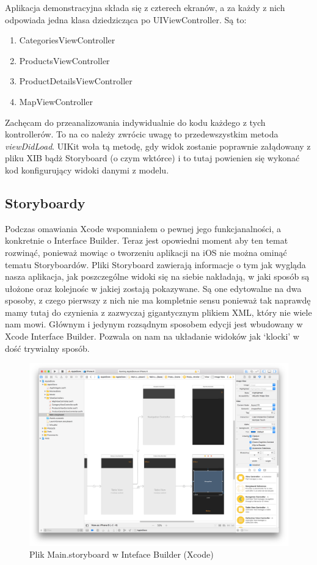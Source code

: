 \documentclass{article}
\begin{document}
Aplikacja demonstracyjna składa się z czterech ekranów, a za każdy z nich odpowiada
jedna klasa dziedzicząca po UIViewController. Są to:
\begin{enumerate}
    \item{CategoriesViewController}
    \item{ProductsViewController}
    \item{ProductDetailsViewController}
    \item{MapViewController}
\end{enumerate}
Zachęcam do przeanalizowania indywidualnie do kodu każdego z tych kontrollerów.
To na co należy zwrócic uwagę to przedewszystkim metoda \textit{viewDidLoad}.
UIKit woła tą metodę, gdy widok zostanie poprawnie załądowany z pliku XIB bądż
Storyboard (o czym wktórce) i to tutaj powienien się wykonać kod konfigurujący 
widoki danymi z modelu.

\subsection*{Storyboardy}
Podczas omawiania Xcode wspomniałem o pewnej jego funkcjanalności, a konkretnie 
o Interface Builder. Teraz jest opowiedni moment aby ten temat rozwinąć, ponieważ
mowiąc o tworzeniu aplikacji na iOS nie można ominąć tematu Storyboardów. Pliki
Storyboard zawierają informacje o tym jak wygląda nasza aplikacja, jak poszczególne
widoki się na siebie nakładają, w jaki sposób są ułożone oraz kolejnośc w jakiej 
zostają pokazywane. Są one edytowalne na dwa sposoby, z czego pierwszy z nich nie
ma kompletnie sensu ponieważ tak naprawdę mamy tutaj do czynienia z zazwyczaj gigantycznym
plikiem XML, który nie wiele nam mowi. Głównym i jedynym rozsądnym sposobem edycji jest
wbudowany w Xcode Interface Builder. Pozwala on nam na układanie widoków jak `klocki'
w dość trywialny sposób.

\begin{figure}[h]
\centering
\includegraphics[width=12cm]{xcode-interfacebuilder}
\caption{Plik Main.storyboard w Inteface Builder (Xcode)}
\end{figure}
\end{document}
